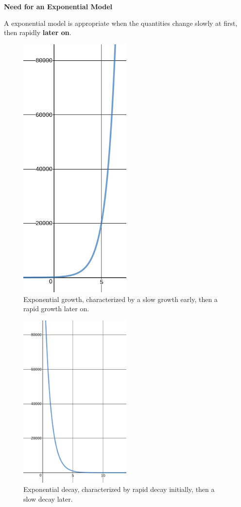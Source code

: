 \documentclass{ximera}
\begin{document}
\begin{theorem}
	\textbf{Need for an Exponential Model}
	
	A exponential model is appropriate when the quantities change slowly at first, then rapidly \textbf{later on}. 
	
	\begin{figure}
		\includegraphics[width=0.5\textwidth]{expGrowth.png}
		\caption{Exponential growth, characterized by a slow growth early, then a rapid growth later on.}
	\end{figure}
	
	\begin{figure}
		\includegraphics[width=0.5\textwidth]{expDecay.png}
		\caption{Exponential decay, characterized by rapid decay initially, then a slow decay later.}
	\end{figure}
	

\end{theorem}
\end{document}
